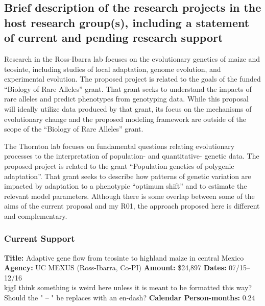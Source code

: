 \renewcommand{\thepage}{Sponsoring Scientist Statement - Page \arabic{page} of 3}

\subsection{Brief description of the research projects in the host research group(s), including a statement of current and pending research support} 

Research in the Ross-Ibarra lab focuses on the evolutionary genetics of maize and teosinte, including studies of local adaptation, genome evolution, and experimental evolution. The proposed project is related to the goals of the funded ``Biology of Rare Alleles'' grant.  That grant seeks to understand the impacts of rare alleles and predict phenotypes from genotyping data. While this proposal will ideally utilize data produced by that grant, its focus on the mechanisms of evolutionary change and the proposed modeling framework are outside of the scope of the ``Biology of Rare Alleles'' grant. 

The Thornton lab focuses on fundamental questions relating evolutionary processes to the interpretation of population- and quantitative- genetic data.  The proposed project is related to the grant ``Population genetics of polygenic adaptation''.   That grant seeks to describe how patterns of genetic variation are impacted by adaptation to a phenotypic ``optimum shift'' and to estimate the relevant model parameters. Although there is some overlap between some of the aims of the current proposal and my R01, the approach proposed here is different and complementary.

\subsubsection*{Current Support}

\textbf{Title:} Adaptive gene flow from teosinte to highland maize in central Mexico
\textbf{Agency:} UC MEXUS (Ross-Ibarra, Co-PI)
\textbf{Amount:} \$24,897
\textbf{Dates:} 07/15– 12/16 \\kjg{I think something is weird here unless it is meant to be formatted this way? Should the " – " be replaces with an en-dash?}
\textbf{Calendar Person-months:} 0.24


